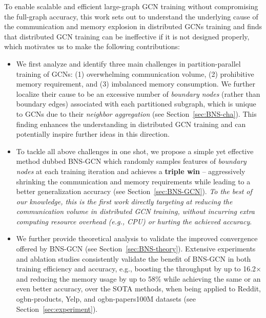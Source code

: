 \documentclass{article}
\begin{document}
To enable scalable and efficient large-graph GCN training without compromising the full-graph accuracy, this work sets out to understand the underlying cause of the communication and memory explosion in distributed GCNs training 
and finds that distributed GCN training can be ineffective if it is not designed properly, 
which motivates us to make the following contributions:
\begin{itemize}

   \item We first analyze and identify three main challenges in partition-parallel training of GCNs: (1) overwhelming communication volume, (2) prohibitive memory requirement, and (3) imbalanced memory consumption. 
   We further localize their cause to be an excessive number of \textit{boundary nodes} (rather than boundary edges) associated with each partitioned subgraph, which is unique to GCNs due to their \textit{neighbor aggregation} (see Section~\ref{sec:BNS-cha}).
	This finding enhances the understanding in distributed GCN training and can potentially inspire further ideas in this direction. 
	
	\item To tackle all above challenges in one shot, we propose a simple yet effective method dubbed BNS-GCN which 
	randomly samples features of \textit{boundary nodes} at each training iteration and achieves a \textbf{triple win} -- aggressively shrinking the communication and memory requirements while leading to a better generalization accuracy (see Section~\ref{sec:BNS-GCN}). 
	\textit{To the best of our knowledge, this is the first work directly targeting at reducing the communication volume in distributed GCN training, without incurring extra computing resource overhead (e.g., CPU) or hurting the achieved accuracy}.

	
	\item We further provide theoretical analysis to validate the improved convergence offered by BNS-GCN (see Section~\ref{sec:BNS-theory}). 
	Extensive experiments and ablation studies consistently validate the benefit of BNS-GCN in both training efficiency and accuracy, e.g., boosting the throughput by up to 16.2$\times$ and reducing the memory usage by up to 58\% while achieving the same or an even better accuracy, over the SOTA methods, when being applied to Reddit, ogbn-products, Yelp, and ogbn-papers100M datasets (see Section~\ref{sec:experiment}).
\end{itemize}
\end{document}
